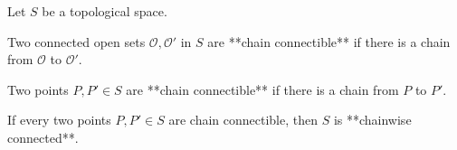 Let $S$ be a topological space.

Two connected open sets $\mathcal{O}, \mathcal{O}'$ in $S$ are **chain connectible** if there is a chain from $\mathcal{O}$ to $\mathcal{O}'$.

Two points $P, P' \in S$ are **chain connectible** if there is a chain from $P$ to $P'$.

If every two points $P, P' \in S$ are chain connectible, then $S$ is **chainwise connected**.
